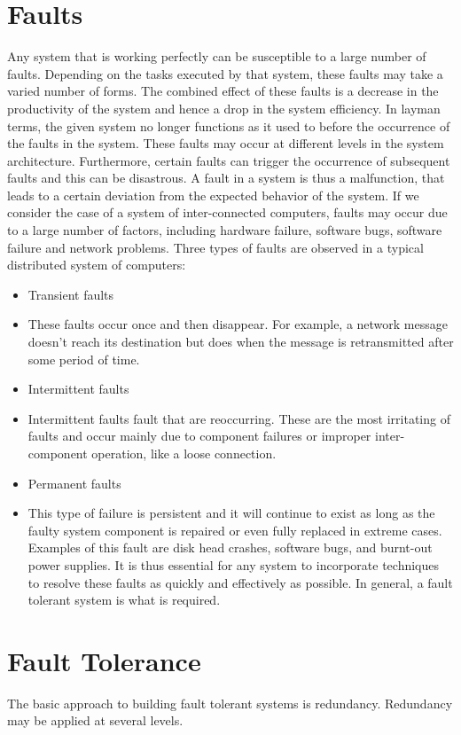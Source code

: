 \section{Faults}
Any system that is working perfectly can be susceptible to a large number of faults. Depending on the tasks executed by that system, these faults may take a varied number of forms. The combined effect of these faults is a decrease in the productivity of the system and hence a drop in the system efficiency. In layman terms, the given system no longer functions as it used to before the occurrence of the faults in the system. These faults may occur at different levels in the system architecture.
Furthermore, certain faults can trigger the occurrence of subsequent faults and this can be disastrous.
A fault in a system is thus a malfunction, that leads to a certain deviation from the expected behavior of the system. If we consider the case of a system of inter-connected computers, faults may occur due to a large number of factors, including hardware failure, software bugs, software failure and network problems. 
Three types of faults are observed in a typical distributed system of computers:
	\begin{itemize}
		\item Transient faults
		\item These faults occur once and then disappear. For example, a network message doesn't reach its destination but does when the message is retransmitted after some period of time. 
		\item Intermittent faults
		\item Intermittent faults fault that are reoccurring. These are the most irritating of faults and occur mainly due to component failures or improper inter-component operation, like a loose connection.
		\item Permanent faults
		\item This type of failure is persistent and it will continue to exist as long as the faulty system component is repaired or even fully replaced in extreme cases. Examples of this fault are disk head crashes, software bugs, and burnt-out power supplies. 
It is thus essential for any system to incorporate techniques to resolve these faults as quickly and effectively as possible. In general, a fault tolerant system is what is required.
	\end{itemize}
\section{Fault Tolerance}
The basic approach to building fault tolerant systems is redundancy. Redundancy may be applied at several levels. 

